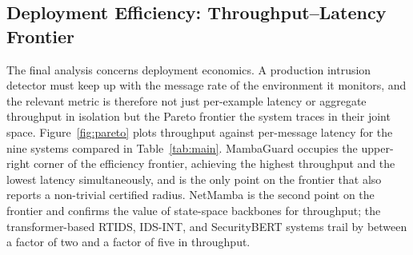 \documentclass[journal,10pt,twocolumn]{IEEEtran}
\begin{document}
\subsection{Deployment Efficiency: Throughput--Latency Frontier}
\label{sec:deployment}
The final analysis concerns deployment economics. A production intrusion detector must keep up with the message rate of the environment it monitors, and the relevant metric is therefore not just per-example latency or aggregate throughput in isolation but the Pareto frontier the system traces in their joint space. Figure~\ref{fig:pareto} plots throughput against per-message latency for the nine systems compared in Table~\ref{tab:main}. MambaGuard occupies the upper-right corner of the efficiency frontier, achieving the highest throughput and the lowest latency simultaneously, and is the only point on the frontier that also reports a non-trivial certified radius. NetMamba is the second point on the frontier and confirms the value of state-space backbones for throughput; the transformer-based RTIDS, IDS-INT, and SecurityBERT systems trail by between a factor of two and a factor of five in throughput.
\end{document}
